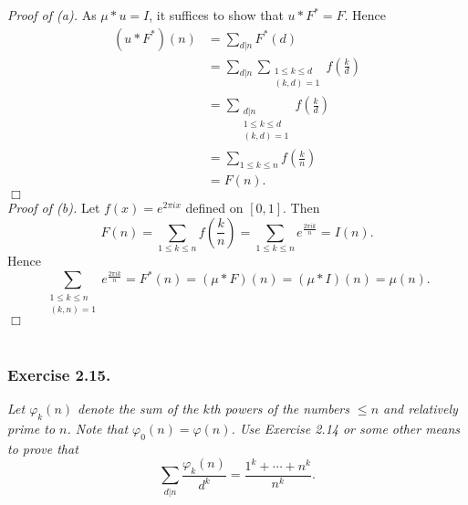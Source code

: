 \documentclass{article}
\begin{document}
\emph{Proof of (a).}
  As $\mu * u = I$, it suffices to show that $u * F^{*} = F$.
  Hence
  \begin{align*}
    (u * F^{*})(n)
    &= \sum_{d|n} F^{*}(d) \\
    &= \sum_{d|n} \sum_{\substack{1 \leq k \leq d \\ (k,d)=1}} f\left( \frac{k}{d} \right) \\
    &= \sum_{\substack{d|n \\ 1 \leq k \leq d \\ (k,d)=1}} f\left( \frac{k}{d} \right) \\
    &= \sum_{1 \leq k \leq n} f\left( \frac{k}{n} \right) \\
    &= F(n).
  \end{align*}
$\Box$ \\



\emph{Proof of (b).}
  Let $f(x) = e^{2\pi i x}$ defined on $[0,1]$.
  Then
  \[
    F(n)
    = \sum_{1 \leq k \leq n} f\left( \frac{k}{n} \right)
    = \sum_{1 \leq k \leq n} e^{\frac{2\pi i k}{n}}
    = I(n).
  \]
  Hence
  \[
    \sum_{\substack{1 \leq k \leq n \\ (k,n)=1}} e^{\frac{2\pi i k}{n}}
    = F^{*}(n)
    = (\mu * F)(n)
    = (\mu * I)(n)
    = \mu(n).
  \]
$\Box$ \\\\






\subsubsection*{Exercise 2.15.}
\emph{Let $\varphi_k(n)$ denote the sum of the $k$th powers of
the numbers $\leq n$ and relatively prime to $n$.
Note that $\varphi_0(n) = \varphi(n)$.
Use Exercise 2.14 or some other means to prove that
\[
  \sum_{d|n} \frac{\varphi_k(n)}{d^k} = \frac{1^k + \cdots + n^k}{n^k}.
\]} \\
\end{document}
